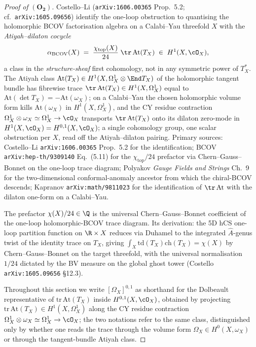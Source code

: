 \begin{proof}[Proof of $(\mathbf{O_2})$]
Costello--Li (\texttt{arXiv:1606.00365} Prop.~5.2; cf.\
\texttt{arXiv:1605.09656}) identify the one-loop obstruction to
quantising the holomorphic BCOV factorisation algebra on a
Calabi--Yau threefold $X$ with the \emph{Atiyah--dilaton cocycle}
\[
 \alpha_{\mathrm{BCOV}}(X)
 \;=\; \frac{\chi_{\mathrm{top}}(X)}{24}\;\tr\,\mathrm{At}(T_X)
 \;\in\; H^{1}(X,\cO_X),
\]
a class in the \emph{structure-sheaf} first cohomology, not in any
symmetric power of $T_X^\ast$. The Atiyah class
$\mathrm{At}(T_X)\in H^1(X,\Omega^1_X\otimes\End T_X)$ of the
holomorphic tangent bundle has fibrewise trace
$\tr\,\mathrm{At}(T_X)\in H^1(X,\Omega^1_X)$ equal to
$\mathrm{At}(\det T_X)=-\mathrm{At}(\omega_X)$; on a Calabi--Yau the
chosen holomorphic volume form kills $\mathrm{At}(\omega_X)$ in
$H^1(X,\Omega^1_X)$, and the CY residue contraction
$\Omega^1_X\otimes\omega_X\simeq\Omega^1_X\to\cO_X$ transports
$\tr\,\mathrm{At}(T_X)$ onto its dilaton zero-mode in
$H^1(X,\cO_X)=H^{0,1}(X,\cO_X)$; a single cohomology group, one
scalar obstruction per $X$, read off the Atiyah--dilaton pairing.
Primary sources: Costello--Li \texttt{arXiv:1606.00365} Prop.~5.2
for the identification; BCOV \texttt{arXiv:hep-th/9309140}
Eq.~(5.11) for the $\chi_{\mathrm{top}}/24$ prefactor via
Chern--Gauss--Bonnet on the one-loop trace diagram; Polyakov
\emph{Gauge Fields and Strings} Ch.~9 for the two-dimensional
conformal-anomaly ancestor from which the chiral-BCOV descends;
Kapranov \texttt{arXiv:math/9811023} for the identification of
$\tr\,\mathrm{At}$ with the dilaton one-form on a Calabi--Yau.

The prefactor $\chi(X)/24 \in \Q$ is the universal
Chern--Gauss--Bonnet coefficient of the one-loop holomorphic-BCOV
trace diagram. Its derivation: the 5D hCS one-loop partition function
on $\R \times X$ reduces via Duhamel to the integrated
$\widehat A$-genus twist of the identity trace on $T_X$, giving
$\int_X \mathrm{td}(T_X) \mathrm{ch}(T_X) = \chi(X)$ by
Chern--Gauss--Bonnet on the target threefold, with the universal
normalisation $1/24$ dictated by the BV measure on the global ghost
tower (Costello \texttt{arXiv:1605.09656} \S 12.3).

Throughout this section we write $[\Omega_X]^{0,1}$ as shorthand for
the Dolbeault representative of $\mathrm{tr}\,\mathrm{At}(T_X)$ inside
$H^{0,1}(X, \cO_X)$, obtained by projecting $\mathrm{tr}\,\mathrm{At}(T_X)
\in H^1(X, \Omega^1_X)$ along the CY residue contraction
$\Omega^1_X \otimes \omega_X \simeq \Omega^1_X \to \cO_X$; the two
notations refer to the same class, distinguished only by whether one
reads the trace through the volume form $\Omega_X \in
H^0(X, \omega_X)$ or through the tangent-bundle Atiyah class.


\end{proof}
